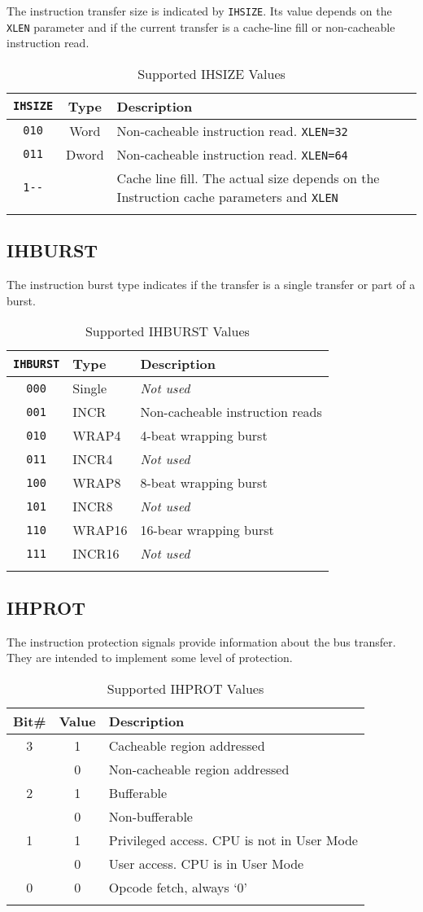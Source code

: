 The instruction transfer size is indicated by \texttt{IHSIZE}. Its value depends
on the \texttt{XLEN} parameter and if the current transfer is a cache-line fill
or non-cacheable instruction read.

\begin{longtable}[]{@{}ccp{7cm}@{}}
	\toprule
	\texttt{IHSIZE} & Type & Description\tabularnewline
	\midrule
	\endhead
	\texttt{010}   & Word  & Non-cacheable instruction read. \texttt{XLEN=32}\tabularnewline
	\texttt{011}   & Dword & Non-cacheable instruction read. \texttt{XLEN=64}\tabularnewline
	\texttt{1-\/-} &       & Cache line fill. The actual size depends on the Instruction cache parameters and \texttt{XLEN}\tabularnewline
	\bottomrule
	\caption{Supported IHSIZE Values}
	\label{tab:isize-values}
\end{longtable}

\subsection{IHBURST}\label{ihburst}

The instruction burst type indicates if the transfer is a single
transfer or part of a burst.

\begin{longtable}[]{@{}cll@{}}
	\toprule
	\texttt{IHBURST} & Type & Description\tabularnewline
	\midrule
	\endhead
	\texttt{000} & Single & \emph{Not used}\tabularnewline
	\texttt{001} & INCR   & Non-cacheable instruction reads\tabularnewline
	\texttt{010} & WRAP4  & 4-beat wrapping burst\tabularnewline
	\texttt{011} & INCR4  & \emph{Not used}\tabularnewline
	\texttt{100} & WRAP8  & 8-beat wrapping burst\tabularnewline
	\texttt{101} & INCR8  & \emph{Not used}\tabularnewline
	\texttt{110} & WRAP16 & 16-bear wrapping burst\tabularnewline
	\texttt{111} & INCR16 & \emph{Not used}\tabularnewline
	\bottomrule
	\caption{Supported IHBURST Values}
	\label{tab:ihburst-values}
\end{longtable}

\subsection{IHPROT}\label{ihprot}

The instruction protection signals provide information about the bus
transfer. They are intended to implement some level of protection.

\begin{longtable}[]{@{}ccl@{}}
\toprule
Bit\# & Value & Description\tabularnewline
\midrule
\endhead
3 & 1 & Cacheable region addressed\tabularnewline
  & 0 & Non-cacheable region addressed\tabularnewline
2 & 1 & Bufferable\tabularnewline
  & 0 & Non-bufferable\tabularnewline
1 & 1 & Privileged access. CPU is not in User Mode\tabularnewline
  & 0 & User access. CPU is in User Mode\tabularnewline
0 & 0 & Opcode fetch, always `0'\tabularnewline
\bottomrule
\caption{Supported IHPROT Values}
\label{tab:ihprot-values}
\end{longtable}



